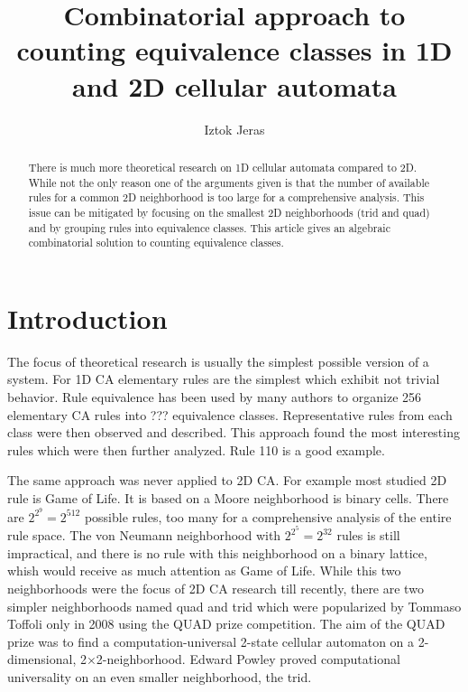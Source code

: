 \documentclass{ijuc}
\begin{document}
\title{Combinatorial approach to counting equivalence classes in 1D and 2D cellular automata}
\author{Iztok Jeras}
\def\received{Received 17 December 2004; In final form 1 April 2005}

\maketitle

\begin{abstract}
There is much more theoretical research on 1D cellular automata compared to 2D.
While not the only reason one of the arguments given is that the number of
available rules for a common 2D neighborhood is too large for a comprehensive
analysis. This issue can be mitigated by focusing on the smallest 2D neighborhoods
(trid and quad) and by grouping rules into equivalence classes. This article
gives an algebraic combinatorial solution to counting equivalence classes.
\end{abstract}


\section{Introduction}

The focus of theoretical research is usually the simplest possible version of a system.
For 1D CA elementary rules are the simplest which exhibit not trivial behavior. Rule
equivalence has been used by many authors to organize 256 elementary CA rules into ???
equivalence classes. Representative rules from each class were then observed and described.
This approach found the most interesting rules which were then further analyzed. Rule 110
is a good example.

The same approach was never applied to 2D CA. For example most studied 2D rule is Game of Life.
It is based on a Moore neighborhood is binary cells. There are $2^{2^9}=2^512$ possible rules,
too many for a comprehensive analysis of the entire rule space. The von Neumann neighborhood
with $2^{2^5}=2^32$ rules is still impractical, and there is no rule with this neighborhood on
a binary lattice, whish would receive as much attention as Game of Life. While this two
neighborhoods were the focus of 2D CA research till recently, there are two simpler neighborhoods
named quad and trid which were popularized by Tommaso Toffoli only in 2008 using the QUAD prize competition.
The aim of the QUAD prize was to find a computation-universal 2-state cellular automaton on a 2-dimensional,
2×2-neighborhood. Edward Powley proved computational universality on an even smaller neighborhood, the trid.
\end{document}
